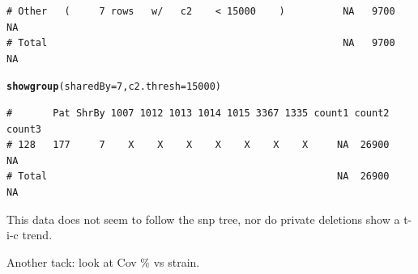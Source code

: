 \documentclass{article}\usepackage[]{graphicx}\usepackage[]{color}
\makeatletter
\newcommand{\hlnum}[1]{\textcolor[rgb]{0.686,0.059,0.569}{#1}}%
\newcommand{\hlstd}[1]{\textcolor[rgb]{0.345,0.345,0.345}{#1}}%
\newcommand{\hlkwc}[1]{\textcolor[rgb]{0.333,0.667,0.333}{#1}}%
\newcommand{\hlkwd}[1]{\textcolor[rgb]{0.737,0.353,0.396}{\textbf{#1}}}%
\newenvironment{kframe}{%
 \def\at@end@of@kframe{}%
 \ifinner\ifhmode%
  \def\at@end@of@kframe{\end{minipage}}%
  \begin{minipage}{\columnwidth}%
 \fi\fi%
 \def\FrameCommand##1{\hskip\@totalleftmargin \hskip-\fboxsep
 \colorbox{shadecolor}{##1}\hskip-\fboxsep
     \hskip-\linewidth \hskip-\@totalleftmargin \hskip\columnwidth}%
 \MakeFramed {\advance\hsize-\width
   \@totalleftmargin\z@ \linewidth\hsize
   \@setminipage}}%
 {\par\unskip\endMakeFramed%
 \at@end@of@kframe}
\newenvironment{knitrout}{}{} %
\makeatother
\begin{document}
\begin{knitrout}
\begin{kframe}
\begin{verbatim}
# Other   (     7 rows   w/   c2    < 15000    )          NA   9700     NA
# Total                                                   NA   9700     NA
\end{verbatim}
\begin{alltt}
\hlkwd{showgroup}\hlstd{(}\hlkwc{sharedBy}\hlstd{=}\hlnum{7}\hlstd{,} \hlkwc{c2.thresh}\hlstd{=}\hlnum{15000}\hlstd{)}
\end{alltt}
\begin{verbatim}
#       Pat ShrBy 1007 1012 1013 1014 1015 3367 1335 count1 count2 count3
# 128   177     7    X    X    X    X    X    X    X     NA  26900     NA
# Total                                                  NA  26900     NA
\end{verbatim}
\end{kframe}
\end{knitrout}

This data does not seem to follow the snp tree, nor do private deletions show a t-i-c trend.

Another tack:  look at Cov \% vs strain.
\end{document}
